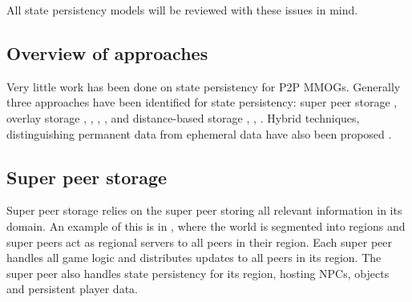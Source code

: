 \documentclass[journal,oneside,a4paper,onecolumn]{IEEEtran}
\begin{document}
All state persistency models will be reviewed with these issues in mind.

\subsection{Overview of approaches}
\label{p2p_mmog_cm_overview}

Very little work has been done on state persistency for P2P MMOGs. Generally three approaches have been identified for state persistency: super peer storage \cite{knutsson_p2p_first}, overlay storage \cite{Douglas05enablingmassively}, \cite{using_freenet_storage}, \cite{overlay_storage1}, \cite{Fan_phd}, \cite{past_storage_focus} and distance-based storage \cite{Buyukkaya_voronoi_state_management}, \cite{Hu_voronoi_IM}, \cite{colyseus_distance_based}. Hybrid techniques, distinguishing permanent data from ephemeral data have also been proposed \cite{zoned_federation}.

\subsection{Super peer storage}

Super peer storage relies on the super peer storing all relevant information in its domain. An example of this is in \cite{knutsson_p2p_first}, where the world is segmented into regions and super peers act as regional servers to all peers in their region. Each super peer handles all game logic and distributes updates to all peers in its region. The super peer also handles state persistency for its region, hosting NPCs, objects and persistent player data.
\end{document}
